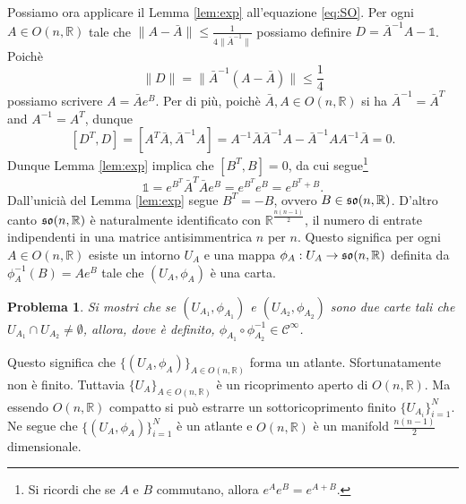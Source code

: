 \documentclass{amsart}
\numberwithin{equation}{section}
\newtheorem{pro}{Problema}
\newcommand\cC{{\mathcal C}}
\newcommand\bR{{\mathbb R}}
\newcommand\Id{{\mathds{1}}}
\newcommand{\lie}{\frak s\frak o}
\begin{document}
Possiamo ora applicare il Lemma \ref{lem:exp} all'equazione \eqref{eq:SO}. Per ogni $A\in O(n,\bR)$ tale che $\|A-\bar A\|\leq \frac 1{4\|\bar A^{-1}\|}$ possiamo definire $D=\bar A^{-1}A-\Id$. Poich\`e 
\[
\|D\|=\|\bar A^{-1}(A -\bar A)\|\leq \frac 14
\]
possiamo scrivere $A=\bar A e^B$. Per di pi\`u, poich\`e $\bar A, A\in O(n,\bR)$ si ha $\bar A^{-1}=\bar A^T$ and $A^{-1}=A^T$, dunque
\[
[D^T,D]=[A^T\bar A, \bar A^{-1}A]=A^{-1}\bar A\bar A^{-1}A-\bar A^{-1}AA^{-1}\bar A=0.
\]
Dunque Lemma \ref{lem:exp} implica che $[B^T,B]=0$, da cui segue\footnote{ Si ricordi che se $A$ e $B$ commutano, allora $e^Ae^B=e^{A+B}$.}
\[
\Id=e^{B^T}\bar A^T\bar Ae^B=e^{B^T}e^{B}=e^{B^T+B}.
\]
Dall'unici\`a del Lemma \ref{lem:exp} segue $B^T=-B$, ovvero $B\in\lie(n,\bR)$. 
D'altro canto $\lie(n,\bR)$ \`e naturalmente identificato con $\bR^{\frac{n(n-1)}2}$, il numero di entrate indipendenti in una matrice antisimmentrica $n$ per $n$. Questo significa per ogni $A\in O(n,\bR)$ esiste un intorno $U_A$ e una mappa $\phi_A: U_A\to \lie(n,\bR)$ definita da $\phi_A^{-1}(B)=Ae^B$ tale che $(U_A, \phi_A)$ \`e una carta.
\begin{pro}
Si mostri che se $(U_{A_1},\phi_{A_1})$ e  $(U_{A_2},\phi_{A_2})$ sono due carte tali che $U_{A_1}\cap U_{A_2}\neq \emptyset$, allora, dove \`e definito, 
$\phi_{A_1}\circ \phi_{A_2}^{-1}\in\cC^\infty$.
\end{pro} 
Questo significa che $\{(U_A,\phi_A)\}_{A\in O(n,\bR)}$ forma un atlante. Sfortunatamente non \`e finito. Tuttavia $\{U_A\}_{A\in O(n,\bR)}$ \`e un ricoprimento aperto di $O(n,\bR)$. Ma essendo  $O(n,\bR)$ compatto si pu\`o estrarre un sottoricoprimento finito $\{U_{A_i}\}_{i=1}^N$. Ne segue che $\{(U_A,\phi_A)\}_{i=1}^N$ \`e un atlante e $O(n,\bR)$ \`e un manifold $\frac{n(n-1)}2$ dimensionale.
\end{document}
